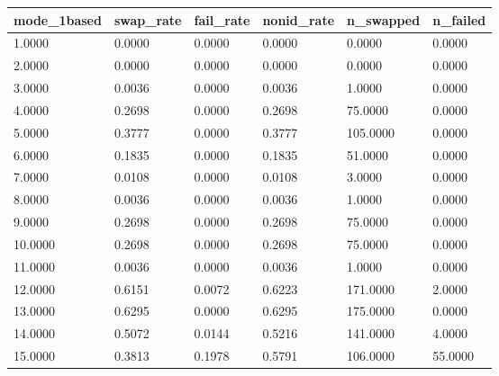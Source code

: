 \begin{tabular}{llllll}
\toprule
mode\_1based & swap\_rate & fail\_rate & nonid\_rate & n\_swapped & n\_failed \\
\midrule
1.0000 & 0.0000 & 0.0000 & 0.0000 & 0.0000 & 0.0000 \\
2.0000 & 0.0000 & 0.0000 & 0.0000 & 0.0000 & 0.0000 \\
3.0000 & 0.0036 & 0.0000 & 0.0036 & 1.0000 & 0.0000 \\
4.0000 & 0.2698 & 0.0000 & 0.2698 & 75.0000 & 0.0000 \\
5.0000 & 0.3777 & 0.0000 & 0.3777 & 105.0000 & 0.0000 \\
6.0000 & 0.1835 & 0.0000 & 0.1835 & 51.0000 & 0.0000 \\
7.0000 & 0.0108 & 0.0000 & 0.0108 & 3.0000 & 0.0000 \\
8.0000 & 0.0036 & 0.0000 & 0.0036 & 1.0000 & 0.0000 \\
9.0000 & 0.2698 & 0.0000 & 0.2698 & 75.0000 & 0.0000 \\
10.0000 & 0.2698 & 0.0000 & 0.2698 & 75.0000 & 0.0000 \\
11.0000 & 0.0036 & 0.0000 & 0.0036 & 1.0000 & 0.0000 \\
12.0000 & 0.6151 & 0.0072 & 0.6223 & 171.0000 & 2.0000 \\
13.0000 & 0.6295 & 0.0000 & 0.6295 & 175.0000 & 0.0000 \\
14.0000 & 0.5072 & 0.0144 & 0.5216 & 141.0000 & 4.0000 \\
15.0000 & 0.3813 & 0.1978 & 0.5791 & 106.0000 & 55.0000 \\
\bottomrule
\end{tabular}
